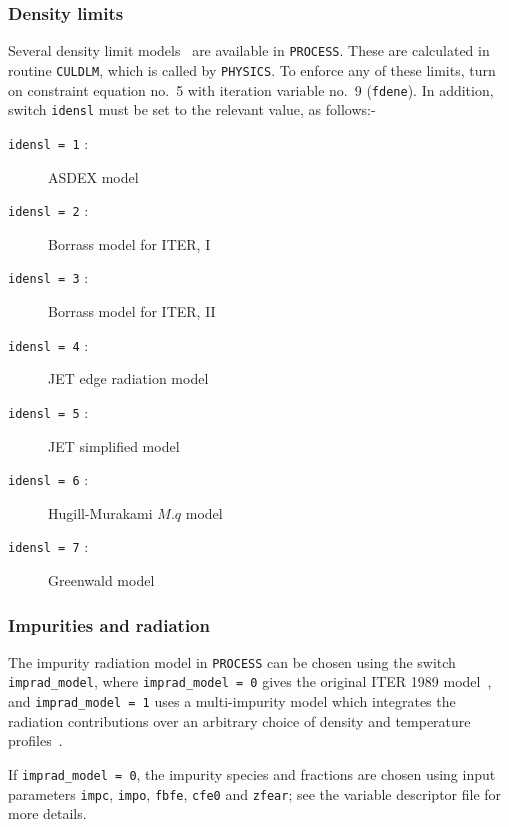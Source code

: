 \documentclass[11pt,a4paper]{report}
\newcommand{\process}{\mbox{\texttt{PROCESS}}}
\begin{document}
\subsubsection{Density limits}

Several density limit models~\cite{172} are available in \process. These are
calculated in routine \texttt{CULDLM}, which is called by \texttt{PHYSICS}.
To enforce any of these limits, turn on constraint equation no.~5 with
iteration variable no.~9 (\texttt{fdene}).  In addition, switch
\texttt{idensl} must be set to the relevant value, as follows:-
\begin{description} %
\item [\texttt{idensl = 1} :] ASDEX model
\item [\texttt{idensl = 2} :] Borrass model for ITER, I
\item [\texttt{idensl = 3} :] Borrass model for ITER, II
\item [\texttt{idensl = 4} :] JET edge radiation model
\item [\texttt{idensl = 5} :] JET simplified model
\item [\texttt{idensl = 6} :] Hugill-Murakami $M.q$ model
\item [\texttt{idensl = 7} :] Greenwald model
\end{description}

\subsubsection{Impurities and radiation}
\label{sec:radiation}

The impurity radiation model in \process\/ can be chosen using the switch
\texttt{imprad\_model}, where \texttt{imprad\_model = 0} gives the original
ITER 1989 model~\cite{kovari_physics}, and \texttt{imprad\_model = 1} uses a
multi-impurity model which integrates the radiation contributions over an
arbitrary choice of density and temperature profiles~\cite{hanni_radiation}.

If \texttt{imprad\_model = 0}, the impurity species and fractions are chosen
using input parameters \texttt{impc}, \texttt{impo}, \texttt{fbfe},
\texttt{cfe0} and \texttt{zfear}; see the variable descriptor file for more
details.
\end{document}
